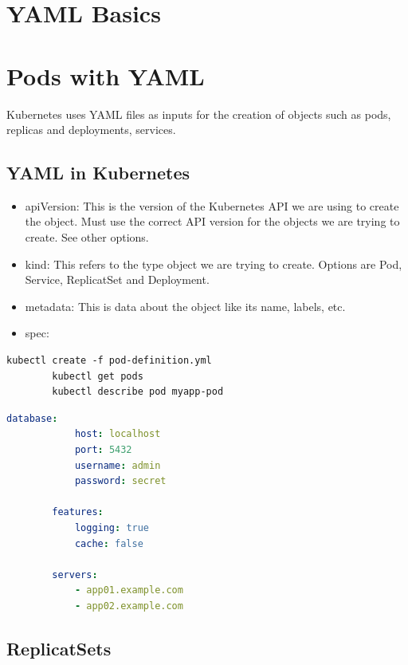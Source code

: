 \documentclass[11pt]{book}
\begin{document}
    \section{YAML Basics}


    \section{Pods with YAML}
    Kubernetes uses YAML files as inputs for the creation of objects such as pods, replicas and deployments, services.

    \subsection{YAML in Kubernetes}
    \begin{itemize}
        \item apiVersion: This is the version of the Kubernetes API we are using to create the object. Must use the correct API version for the objects we are trying to create. See other options.
        \item kind: This refers to the type object we are trying to create. Options are Pod, Service, ReplicatSet and Deployment.
        \item metadata: This is data about the object like its name, labels, etc.
        \item spec:
    \end{itemize}


    \begin{lstlisting}[language=terminal,caption={Pod commands}]
        kubectl create -f pod-definition.yml
        kubectl get pods
        kubectl describe pod myapp-pod
    \end{lstlisting}

    \begin{lstlisting}[language=yaml, caption={Example YAML Configuration}]
        database:
            host: localhost
            port: 5432
            username: admin
            password: secret

        features:
            logging: true
            cache: false

        servers:
            - app01.example.com
            - app02.example.com
    \end{lstlisting}

    \subsection{ReplicatSets}
\end{document}
